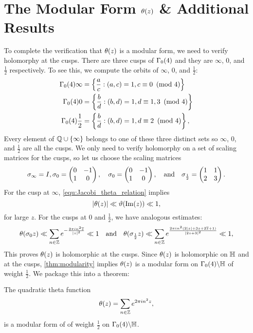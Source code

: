 \documentclass[12pt,reqno,oneside]{amsart}
\begin{document}
\section{The Modular Form \texorpdfstring{$\theta(z)$}{t(z)} \& Additional Results}
    To complete the verification that $\theta(z)$ is a modular form, we need to verify holomorphy at the cusps. There are three cusps of $\Gamma_{0}(4)$ and they are $\infty$, $0$, and $\frac{1}{2}$ respectively. To see this, we compute the orbits of $\infty$, $0$, and $\frac{1}{2}$:
    \begin{align*}
        \Gamma_{0}(4)\infty &= \left\{\frac{a}{c}:(a,c) = 1, c \equiv 0 \ \left(\text{mod }4\right) \right\} \\
        \Gamma_{0}(4)0 &= \left\{\frac{b}{d}:(b,d) = 1, d \equiv 1,3 \ \left(\text{mod }4\right) \right\} \\
        \Gamma_{0}(4)\frac{1}{2} &= \left\{\frac{b}{d}:(b,d) = 1, d \equiv 2 \ \left(\text{mod }4\right) \right\},
    \end{align*}
    Every element of $\mathbb{Q} \cup \{\infty\}$ belongs to one of these three distinct sets so $\infty$, $0$, and $\frac{1}{2}$ are all the cusps. We only need to verify holomorphy on a set of scaling matrices for the cusps, so let us choose the scaling matrices
    \[
        \sigma_{\infty} = I, \sigma_{0} = \begin{pmatrix} 0 & -1 \\ 1 & 0 \end{pmatrix}, \quad \sigma_{0} = \begin{pmatrix} 0 & -1 \\ 1 & 0 \end{pmatrix}, \quad \text{and} \quad \sigma_{\frac{1}{2}} = \begin{pmatrix} 1 & 1 \\ 2 & 3 \end{pmatrix}.
    \]
    For the cusp at $\infty$, \cref{equ:Jacobi_theta_relation} implies
    \[
        |\theta(z)| \ll \vartheta(\mathrm{Im}(z)) \ll 1,
    \]
    for large $z$. For the cusps at $0$ and $\frac{1}{2}$, we have analogous estimates:
    \[
    \theta(\sigma_{0} z) \ll \sum_{n \in \mathbb{Z}}e^{-\frac{2\pi in^{2}\overline{z}}{|z|^{2}}} \ll 1 \quad \text{and} \quad \theta(\sigma_{\frac{1}{2}} z) \ll \sum_{n \in \mathbb{Z}}e^{\frac{2\pi in^{2}(2|z|+3z+2\overline{z}+1)}{|2z+3|^{2}}} \ll 1,
    \]
    This proves $\theta(z)$ is holomorphic at the cusps. Since $\theta(z)$ is holomorphic on $\mathbb{H}$ and at the cusps, \cref{thm:modularity} implies $\theta(z)$ is a modular form on $\Gamma_{0}(4)\backslash\mathbb{H}$ of weight $\frac{1}{2}$. We package this into a theorem:

    \begin{theorem}\label{thm:quadratic_theta_is_modular}
    The quadratic theta function
    \[
        \theta(z) = \sum_{n \in \mathbb{Z}}e^{2\pi in^{2}z},
    \]
    is a modular form of of weight $\frac{1}{2}$ on $\Gamma_{0}(4)\backslash\mathbb{H}$.
    \end{theorem}
\end{document}
